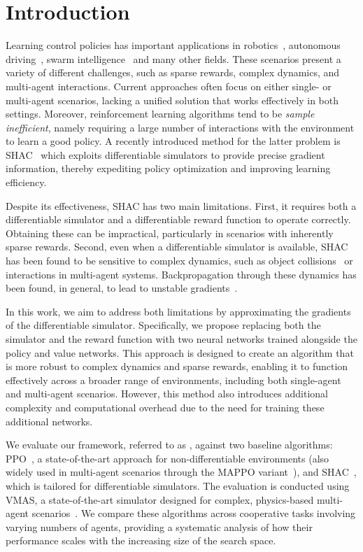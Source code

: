 \section{Introduction}\label{sect:introduction}

Learning control policies has important applications in robotics~\cite{Singh22}, autonomous driving~\cite{Elallid22}, swarm intelligence~\cite{Tang21} and many other fields. These scenarios present a variety of different challenges, such as sparse rewards, complex dynamics, and multi-agent interactions. Current approaches often focus on either single- or multi-agent scenarios, lacking a unified solution that works effectively in both settings. Moreover, reinforcement learning algorithms tend to be \emph{sample inefficient}, namely requiring a large number of interactions with the environment to learn a good policy.
A recently introduced method for the latter problem is SHAC~\cite{Xu22} which exploits differentiable simulators to provide precise gradient information, thereby expediting policy optimization and improving learning efficiency.

Despite its effectiveness, SHAC has two main limitations. First, it requires both a differentiable simulator and a differentiable reward function to operate correctly. Obtaining these can be impractical, particularly in scenarios with inherently sparse rewards. Second, even when a differentiable simulator is available, SHAC has been found to be sensitive to complex dynamics, such as object collisions~\cite{Georgiev24} or interactions in multi-agent systems. Backpropagation through these dynamics has been found, in general, to lead to unstable gradients~\cite{Bengio94,Metz21}.

In this work, we aim to address both limitations by approximating the gradients of the differentiable simulator. Specifically, we propose replacing both the simulator and the reward function with two neural networks trained alongside the policy and value networks. This approach is designed to create an algorithm that is more robust to complex dynamics and sparse rewards, enabling it to function effectively across a broader range of environments, including both single-agent and multi-agent scenarios. However, this method also introduces additional complexity and computational overhead due to the need for training these additional networks.

We evaluate our framework, referred to as \fname{}, against two baseline algorithms: PPO~\cite{Schulman17}, a state-of-the-art approach for non-differentiable environments (also widely used in multi-agent scenarios through the MAPPO variant~\cite{DBLP:conf/nips/YuVVGWBW22}), and SHAC~\cite{Xu22}, which is tailored for differentiable simulators. The evaluation is conducted using VMAS, a state-of-the-art simulator designed for complex, physics-based multi-agent scenarios~\cite{DBLP:conf/dars/BettiniKBP22}. We compare these algorithms across cooperative tasks involving varying numbers of agents, providing a systematic analysis of how their performance scales with the increasing size of the search space.

